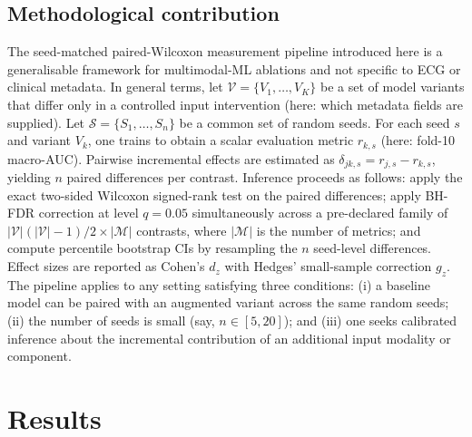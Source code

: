 \documentclass[mathematics,article,submit,pdftex]{Definitions/mdpi}
\def\mathrm#1{#1}%
\begin{document}
\subsection{Methodological contribution}
The seed-matched paired-Wilcoxon measurement pipeline introduced here is a generalisable framework for multimodal-ML ablations and not specific to ECG or clinical metadata. In general terms, let $\mathcal{V} = \{V_1, \ldots, V_K\}$ be a set of model variants that differ only in a controlled input intervention (here: which metadata fields are supplied). Let $\mathcal{S} = \{S_1, \ldots, S_n\}$ be a common set of random seeds. For each seed $s$ and variant $V_k$, one trains to obtain a scalar evaluation metric $r_{k,s}$ (here: fold-10 macro-AUC). Pairwise incremental effects are estimated as $\delta_{jk,s} = r_{j,s} - r_{k,s}$, yielding $n$ paired differences per contrast. Inference proceeds as follows: apply the exact two-sided Wilcoxon signed-rank test on the paired differences; apply BH-FDR correction at level $q = 0.05$ simultaneously across a pre-declared family of $|\mathcal{V}|(|\mathcal{V}|-1)/2 \times |\mathcal{M}|$ contrasts, where $|\mathcal{M}|$ is the number of metrics; and compute percentile bootstrap CIs by resampling the $n$ seed-level differences. Effect sizes are reported as Cohen's $d_{\mathrm{z}}$ with Hedges' small-sample correction $g_{\mathrm{z}}$. The pipeline applies to any setting satisfying three conditions: (i) a baseline model can be paired with an augmented variant across the same random seeds; (ii) the number of seeds is small (say, $n \in [5, 20]$); and (iii) one seeks calibrated inference about the incremental contribution of an additional input modality or component.

\section{Results}\label{sec:results}
\end{document}

